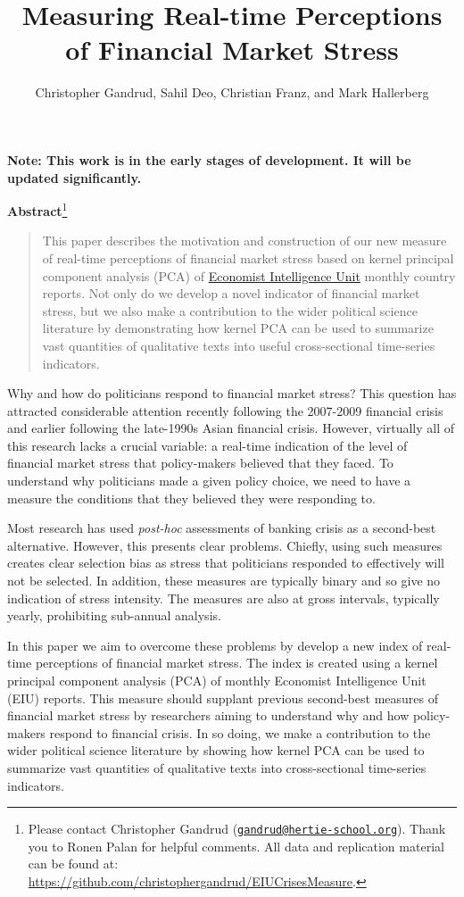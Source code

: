 \documentclass[]{article}
\title{Measuring Real-time Perceptions of Financial Market Stress}
\author{Christopher Gandrud, Sahil Deo, Christian Franz, and Mark Hallerberg}
\date{}
\let\rmarkdownfootnote\footnote%
\def\footnote{\protect\rmarkdownfootnote}
\begin{document}
\maketitle


\textbf{Note: This work is in the early stages of development. It will
be updated significantly.}

\textbf{Abstract}\footnote{Please contact Christopher Gandrud
  (\href{mailto:gandrud@hertie-school.org}{\nolinkurl{gandrud@hertie-school.org}}).
  Thank you to Ronen Palan for helpful comments. All data and
  replication material can be found at:
  \url{https://github.com/christophergandrud/EIUCrisesMeasure}.}

\begin{quote}
This paper describes the motivation and construction of our new measure
of real-time perceptions of financial market stress based on kernel
principal component analysis (PCA) of
\href{http://www.eiu.com/}{Economist Intelligence Unit} monthly country
reports. Not only do we develop a novel indicator of financial market
stress, but we also make a contribution to the wider political science
literature by demonstrating how kernel PCA can be used to summarize vast
quantities of qualitative texts into useful cross-sectional time-series
indicators.
\end{quote}

Why and how do politicians respond to financial market stress? This
question has attracted considerable attention recently following the
2007-2009 financial crisis and earlier following the late-1990s Asian
financial crisis. However, virtually all of this research lacks a
crucial variable: a real-time indication of the level of financial
market stress that policy-makers believed that they faced. To understand
why politicians made a given policy choice, we need to have a measure
the conditions that they believed they were responding to.

Most research has used \emph{post-hoc} assessments of banking crisis as
a second-best alternative. However, this presents clear problems.
Chiefly, using such measures creates clear selection bias as stress that
politicians responded to effectively will not be selected. In addition,
these measures are typically binary and so give no indication of stress
intensity. The measures are also at gross intervals, typically yearly,
prohibiting sub-annual analysis.

In this paper we aim to overcome these problems by develop a new index
of real-time perceptions of financial market stress. The index is
created using a kernel principal component analysis (PCA) of monthly
Economist Intelligence Unit (EIU) reports. This measure should supplant
previous second-best measures of financial market stress by researchers
aiming to understand why and how policy-makers respond to financial
crisis. In so doing, we make a contribution to the wider political
science literature by showing how kernel PCA can be used to summarize
vast quantities of qualitative texts into cross-sectional time-series
indicators.
\end{document}
